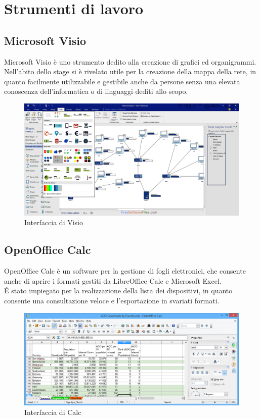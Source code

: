 \documentclass[Tesi.tex]{subfiles}
\begin{document}
\newpage
\section{Strumenti di lavoro}

\subsection{Microsoft Visio}
Microsoft Visio è uno strumento dedito alla creazione di grafici ed organigrammi. \\
Nell'abito dello stage si è rivelato utile per la creazione della mappa della rete, in quanto facilmente utilizzabile e gestibile anche da persone senza una elevata conoscenza dell'informatica o di linguaggi dediti allo scopo.
\begin{figure}[H]
	\centering
	\includegraphics[width=0.73\linewidth]{"images/Visio_esempio"}
	\caption{Interfaccia di Visio}
	\label{fig:Interfaccia di Visio}
\end{figure}

\subsection{OpenOffice Calc}
OpenOffice Calc è un software per la gestione di fogli elettronici, che consente anche di aprire i formati gestiti da LibreOffice Calc e Microsoft Excel. \\
\'E stato impiegato per la realizzazione della lista dei dispositivi, in quanto consente una consultazione veloce e l'esportazione in svariati formati.
\begin{figure}[H]
	\centering
	\includegraphics[width=0.77\linewidth]{"images/screen_calc"}
	\caption{Interfaccia di Calc}
	\label{fig:Interfaccia di Calc}
\end{figure}
\end{document}
